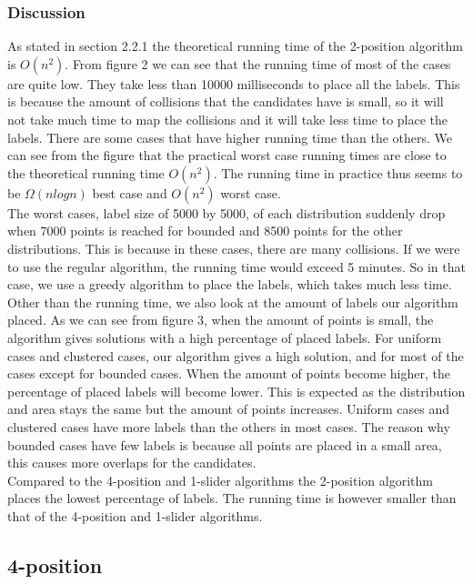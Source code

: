 \documentclass[crop=false,a4paper,oneside,11pt]{standalone}
\begin{document}
\subsubsection{Discussion}
As stated in section 2.2.1 the theoretical running time of the 2-position algorithm is $O(n^2)$. From figure 2 we can see that the running time of most of the cases are quite low. They take less than 10000 milliseconds to place all the labels. This is because the amount of collisions that the candidates have is small, so it will not take much time to map the collisions and it will take less time to place the labels. There are some cases that have higher running time than the others. We can see from the figure that the practical worst case running times are close to the theoretical running time $O(n^2)$. The running time in practice thus seems to be $\Omega(nlogn)$ best case and $O(n^2)$ worst case.\\
The worst cases, label size of 5000 by 5000, of each distribution suddenly drop when 7000 points is reached for bounded and 8500 points for the other distributions. This is because in these cases, there are many collisions. If we were to use the regular algorithm, the running time would exceed 5 minutes. So in that case, we use a greedy algorithm to place the labels, which takes much less time.\\
Other than the running time, we also look at the amount of labels our algorithm placed. As we can see from figure 3, when the amount of points is small, the algorithm gives solutions with a high percentage of placed labels. For uniform cases and clustered cases, our algorithm gives a high solution, and for most of the cases except for bounded cases. When the amount of points become higher, the percentage of placed labels will become lower. This is expected as the distribution and area stays the same but the amount of points increases. Uniform cases and clustered cases have more labels than the others in most cases. The reason why bounded cases have few labels is because all points are placed in a small area, this causes more overlaps for the candidates.\\
Compared to the 4-position and 1-slider algorithms the 2-position algorithm places the lowest percentage of labels. The running time is however smaller than that of the 4-position and 1-slider algorithms. 


\subsection{4-position}
\end{document}

